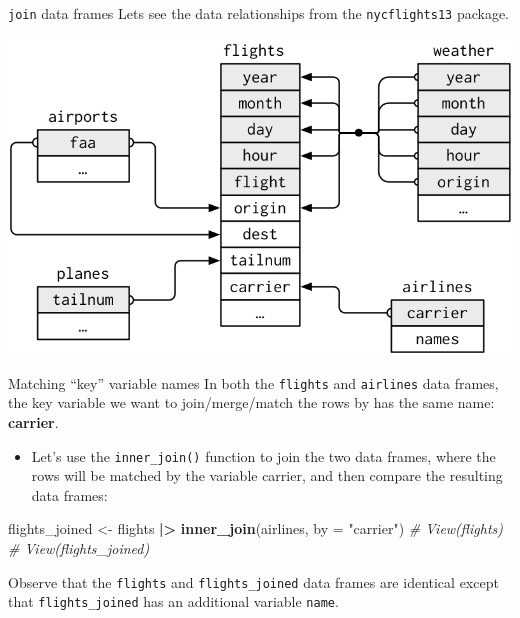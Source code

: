 \documentclass[
  ignorenonframetext,
]{beamer}
\newenvironment{Shaded}{\begin{snugshade}}{\end{snugshade}}
\newcommand{\AttributeTok}[1]{\textcolor[rgb]{0.13,0.29,0.53}{#1}}
\newcommand{\CommentTok}[1]{\textcolor[rgb]{0.56,0.35,0.01}{\textit{#1}}}
\newcommand{\FunctionTok}[1]{\textcolor[rgb]{0.13,0.29,0.53}{\textbf{#1}}}
\newcommand{\NormalTok}[1]{#1}
\newcommand{\OtherTok}[1]{\textcolor[rgb]{0.56,0.35,0.01}{#1}}
\newcommand{\SpecialCharTok}[1]{\textcolor[rgb]{0.81,0.36,0.00}{\textbf{#1}}}
\newcommand{\StringTok}[1]{\textcolor[rgb]{0.31,0.60,0.02}{#1}}
\providecommand{\tightlist}{%
  \setlength{\itemsep}{0pt}\setlength{\parskip}{0pt}}
\begin{document}
\begin{frame}[fragile]{\texttt{join} data frames}
\protect\hypertarget{join-data-frames-1}{}
Lets see the data relationships from the \texttt{nycflights13} package.

\begin{center}\includegraphics[width=0.8\linewidth,height=0.6\textheight]{week3_5} \end{center}
\end{frame}

\begin{frame}[fragile]{Matching ``key'' variable names}
\protect\hypertarget{matching-key-variable-names}{}
In both the \texttt{flights} and \texttt{airlines} data frames, the key
variable we want to join/merge/match the rows by has the same name:
\textbf{carrier}.

\begin{itemize}
\tightlist
\item
  Let's use the \texttt{inner\_join()} function to join the two data
  frames, where the rows will be matched by the variable carrier, and
  then compare the resulting data frames:
\end{itemize}

\normalsize

\begin{Shaded}
\begin{Highlighting}[]
\NormalTok{flights\_joined }\OtherTok{\textless{}{-}}\NormalTok{ flights }\SpecialCharTok{|\textgreater{}} 
  \FunctionTok{inner\_join}\NormalTok{(airlines, }\AttributeTok{by =} \StringTok{"carrier"}\NormalTok{)}
\CommentTok{\# View(flights)}
\CommentTok{\# View(flights\_joined)}
\end{Highlighting}
\end{Shaded}

\normalsize

Observe that the \texttt{flights} and \texttt{flights\_joined} data
frames are identical except that \texttt{flights\_joined} has an
additional variable \texttt{name}.
\end{frame}
\end{document}
